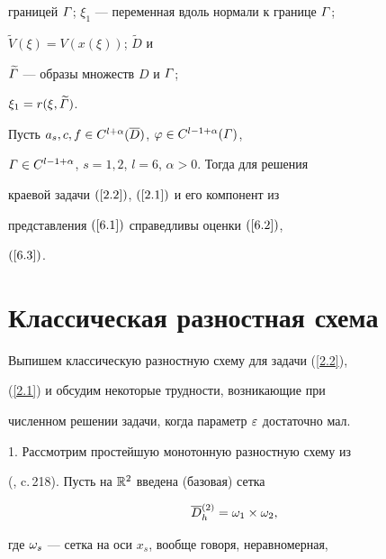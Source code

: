 границей $\varGamma$; $\xi_1$ --- переменная вдоль нормали к границе $\varGamma$;


$\widetilde{V}(\xi)=V(x(\xi))$; $\widetilde{D}$ и


$\widetilde{\varGamma}$  --- образы множеств $D$ и $\varGamma$; 


$\xi_1=r(\xi,\widetilde{\varGamma})$.





\begin{thms} \label{t.6.1}


Пусть $a_s, c, f \in C^{l+\alpha}(\overline{D})$, $\varphi \in C^{l-1+\alpha}(\varGamma)$, 


$\varGamma\in C^{l-1+\alpha}$, $s=1,2$, $l=6$, $\alpha>0$. Тогда для решения


краевой задачи $(\ref{2.2})$, $(\ref{2.1})$ и его компонент из


представления $(\ref{6.1})$ справедливы оценки $(\ref{6.2})$,


$(\ref{6.3})$.


\end{thms}





\section{Классическая разностная схема}\label{section.3}





Выпишем классическую разностную схему для задачи (\ref{2.2}),


(\ref{2.1}) и обсудим некоторые трудности, возникающие при


численном решении задачи, когда параметр $\varepsilon$ достаточно мал.





1. Рассмотрим простейшую монотонную разностную схему из


(\cite{5}, c.\,218). Пусть на $\Bbb R^2$ введена (базовая) сетка


\beqs \label{3.1}


\begin{equation}\label{3.1a}


\Db{}_h^{(2)}=\om_1 \times \om_2,


\end{equation}


где $\omega_s$ --- сетка на оси $x_s$, вообще говоря, неравномерная,


